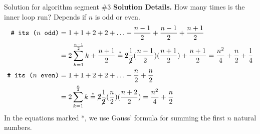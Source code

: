 \documentclass[10pt]{beamer}
\begin{document}
\begin{frame}{Solution for algorithm segment \#3}
\colorbox{red!30}{\textbf{Solution Details.}}
How many times is the inner loop run? 
Depends if $n$ is odd or even.
 \begin{align*}
\texttt{\# its ($n$ odd)} & = 1+1 + 2 +2 + \hdots + \frac{n-1}{2} + \frac{n-1}{2} + \frac{n+1}{2} \\
&= 2 \sum_{k=1}^{\frac{n-1}{2}} k + \frac{n+1}{2} \stackrel{*}{=} \cancel{2} \frac{1}{\cancel{2}} (\frac{n-1}{2})(\frac{n+1}{2}) + \frac{n+1}{2} =  \frac{n^2}{4} + \frac{n}{2} + \frac{1}{4} \\
\texttt{\# its ($n$ even)} & = 1+1 + 2 +2 + \hdots + \frac{n}{2} + \frac{n}{2} \\
&= 2 \sum_{k=1}^{\frac{n}{2}} k  \stackrel{*}{=} \cancel{2} \frac{1}{\cancel{2}} (\frac{n}{2})(\frac{n+2}{2}) =    \frac{n^2}{4} + \frac{n}{2}
 \end{align*}
%
In the equations marked *, we use Gauss' formula for summing the first $n$ natural numbers. 
\end{frame}
\end{document}
